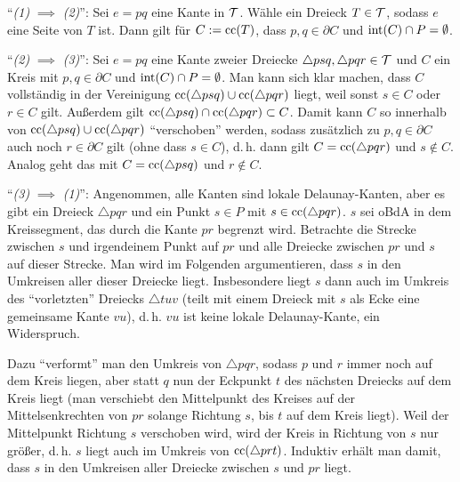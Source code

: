 \begin{Beweis}
    "`\emph{(1)} $\implies$ \emph{(2)}"':
    Sei $e = pq$ eine Kante in $\mathcal{T}$.
    Wähle ein Dreieck $T \in \mathcal{T}$, sodass $e$ eine Seite von $T$ ist.
    Dann gilt für $C := \operatorname{cc}(T)$, dass $p, q \in \partial C$ und $\operatorname{int}(C) \cap P = \emptyset$.
    
    "`\emph{(2)} $\implies$ \emph{(3)}"':
    Sei $e = pq$ eine Kante zweier Dreiecke $\triangle psq, \triangle pqr \in \mathcal{T}$
    und $C$ ein Kreis mit $p, q \in \partial C$ und $\operatorname{int}(C) \cap P = \emptyset$.
    Man kann sich klar machen, dass $C$ vollständig in der Vereinigung
    $\operatorname{cc}(\triangle psq) \cup \operatorname{cc}(\triangle pqr)$ liegt, weil sonst $s \in C$ oder $r \in C$ gilt.
    Außerdem gilt $\operatorname{cc}(\triangle psq) \cap \operatorname{cc}(\triangle pqr) \subset C$.
    Damit kann $C$ so innerhalb von $\operatorname{cc}(\triangle psq) \cup \operatorname{cc}(\triangle pqr)$ "`verschoben"'
    werden, sodass zusätzlich zu $p, q \in \partial C$ auch noch $r \in \partial C$ gilt
    (ohne dass $s \in C$), d.\,h. dann gilt $C = \operatorname{cc}(\triangle pqr)$ und $s \notin C$.
    Analog geht das mit $C = \operatorname{cc}(\triangle psq)$ und $r \notin C$.
    
    "`\emph{(3)} $\implies$ \emph{(1)}"':
    Angenommen, alle Kanten sind lokale Delaunay-Kanten, aber es gibt ein Dreieck $\triangle pqr$
    und ein Punkt $s \in P$ mit $s \in \operatorname{cc}(\triangle pqr)$.
    $s$ sei oBdA in dem Kreissegment, das durch die Kante $pr$ begrenzt wird.
    Betrachte die Strecke zwischen $s$ und irgendeinem Punkt auf $pr$ und
    alle Dreiecke zwischen $pr$ und $s$ auf dieser Strecke.
    Man wird im Folgenden argumentieren, dass $s$ in den Umkreisen aller dieser Dreiecke liegt.
    Insbesondere liegt $s$ dann auch im Umkreis des "`vorletzten"' Dreiecks $\triangle tuv$
    (teilt mit einem Dreieck mit $s$ als Ecke eine gemeinsame Kante $vu$),
    d.\,h. $vu$ ist keine lokale Delaunay-Kante, ein Widerspruch.
    
    Dazu "`verformt"' man den Umkreis von $\triangle pqr$, sodass $p$ und $r$ immer noch auf dem
    Kreis liegen, aber statt $q$ nun der Eckpunkt $t$ des nächsten Dreiecks auf dem Kreis liegt
    (man verschiebt den Mittelpunkt des Kreises auf der Mittelsenkrechten von $pr$ solange
    Richtung $s$, bis $t$ auf dem Kreis liegt).
    Weil der Mittelpunkt Richtung $s$ verschoben wird, wird der Kreis in Richtung von $s$ nur
    größer, d.\,h. $s$ liegt auch im Umkreis von $\operatorname{cc}(\triangle prt)$.
    Induktiv erhält man damit, dass $s$ in den Umkreisen aller Dreiecke zwischen $s$ und $pr$
    liegt.
\end{Beweis}

